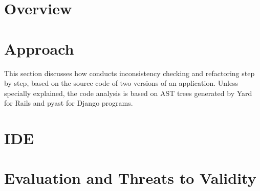 
\section{Overview}


 


\section{Approach}
\label{sec:approach}
This section discusses how \Tool conducts inconsistency checking and refactoring
step by step, based on the source code of 
two versions of an application.
Unless specially explained,
the code analysis is based on
AST trees generated by Yard \cite{yard} for Rails
 and 
pyast \cite{pyparser} for Django programs.



\section{\ETool{} IDE}


\section{Evaluation and Threats to Validity}




 
